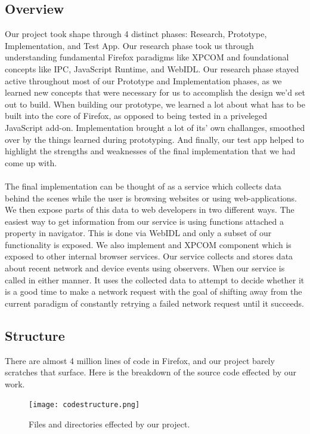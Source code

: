 \documentclass[12pt]{article}
\begin{document}
\subsection{Overview}
Our project took shape through 4 distinct phases: Research, Prototype, Implementation, and Test App. Our research phase took us through understanding fundamental Firefox paradigms like XPCOM and foundational concepts like IPC, JavaScript Runtime, and WebIDL. Our research phase stayed active throughout most of our Prototype and Implementation phases, as we learned new concepts that were necessary for us to accomplish the design we'd set out to build. When building our prototype, we learned a lot about what has to be built into the core of Firefox, as opposed to being tested in a priveleged JavaScript add-on. Implementation brought a lot of its' own challanges, smoothed over by the things learned during prototyping. And finally, our test app helped to highlight the strengths and weaknesses of the final implementation that we had come up with.
\\\\
The final implementation can be thought of as a service which collects data behind the scenes while the user is browsing websites or using web-applications.  We then expose parts of this data to web developers in two different ways.  The easiest way to get information from our service is using functions attached a property in navigator.  This is done via WebIDL and only a subset of our functionality is exposed. We also implement and XPCOM component which is exposed to other internal browser services. Our service collects and stores data about recent network and device events using observers. When our service is called in either manner. It uses the collected data to attempt to decide whether it is a good time to make a network request with the goal of shifting away from the current paradigm of constantly retrying a failed network request until it succeeds.  
\pagebreak
\subsection{Structure}
There are almost 4 million lines of code in Firefox, and our project barely scratches that surface. Here is the breakdown of the source code effected by our work.

\begin{figure}[h!]
  \centering
		\texttt{[image: codestructure.png]}
  \caption{Files and directories effected by our project.}
\end{figure}
\pagebreak
\end{document}
